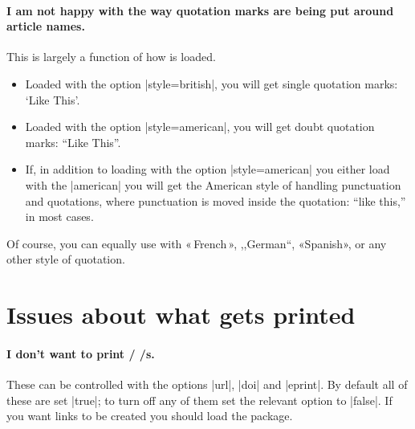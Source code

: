 \paragraph{I am not happy with the way quotation marks are being put
  around article names.} This is largely a function of how
 is loaded.
\begin{itemize}
\item Loaded with the option |style=british|, you will get single
   quotation marks: `Like This'.
\item Loaded with the option |style=american|, you will get doubt
   quotation marks: ``Like This''.
\item If, in addition to loading  with the option
   |style=american| you either load  with the
   |american| you will get the American style of handling punctuation
   and quotations, where punctuation is moved inside the quotation:
   ``like this,'' in most cases.
\end{itemize}
Of course, you can equally use  with «\,French\,»,
,,German``, «Spanish», or any other style of quotation.


\section{Issues about what gets printed}

\paragraph{I don't want to print \slash
  \slash {}s.} These can be controlled
with the options |url|, |doi| and |eprint|. By default all of these
are set |true|; to turn off any of them set the relevant option to
|false|. If you want links to be created you should load the
 package.

